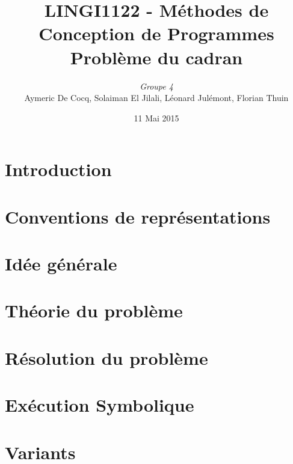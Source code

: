 \documentclass[11pt,a4paper]{article}
\author{\textit{Groupe 4}\\
Aymeric De Cocq, Solaiman El Jilali, Léonard Julémont, Florian Thuin}
\title{LINGI1122 - Méthodes de Conception de Programmes\\
Problème du cadran}
\date{11 Mai 2015}
\begin{document}
\maketitle

\section* {Introduction}


\section{Conventions de représentations}

\section{Idée générale}


 
\section{Théorie du problème}




\section{Résolution du problème}





\section{Exécution Symbolique}

\section{Variants}
\end{document}

